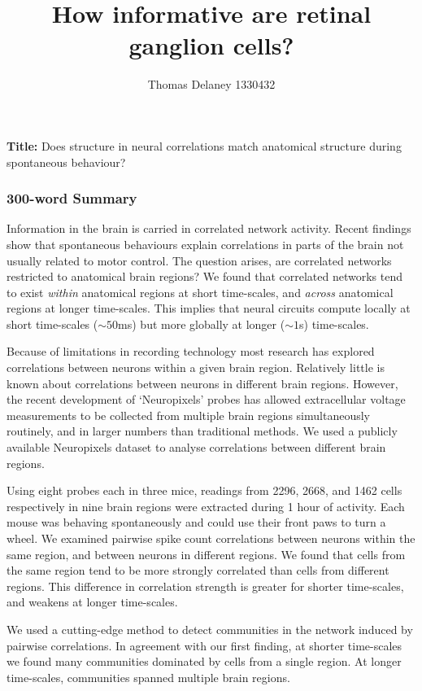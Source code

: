 \documentclass[a4paper,12pt]{article}
\title{How informative are retinal ganglion cells?}
\author{Thomas Delaney 1330432}
\theoremstyle{definition}
\begin{document}
\noindent
\textbf{Title:} Does structure in neural correlations match anatomical structure during spontaneous behaviour?
\vspace{-0.5cm}
\subsubsection*{300-word Summary}
\vspace{-0.3cm}
Information in the brain is carried in correlated network activity\cite{cohen1, cohen2}. Recent findings show that spontaneous behaviours explain correlations in parts of the brain not usually related to motor control\cite{stringer}. The question arises, are correlated networks restricted to anatomical brain regions? We found that correlated networks tend to exist \textit{within} anatomical regions at short time-scales, and \textit{across} anatomical regions at longer time-scales. This implies that neural circuits compute locally at short time-scales ($\sim 50$ms) but more globally at longer ($\sim 1$s) time-scales. 

Because of limitations in recording technology most research has explored correlations between neurons within a given brain region. Relatively little is known about correlations between neurons in different brain regions. However, the recent development of `Neuropixels' probes\cite{jun} has allowed extracellular voltage measurements to be collected from multiple brain regions simultaneously routinely, and in larger numbers than traditional methods. We used a publicly available Neuropixels dataset to analyse correlations between different brain regions.

Using eight probes each in three mice, readings from 2296, 2668, and 1462 cells respectively in nine brain regions were extracted during 1 hour of activity. Each mouse was behaving spontaneously and could use their front paws to turn a wheel\cite{stringer}. We examined pairwise spike count correlations between neurons within the same region, and between neurons in different regions. We found that cells from the same region tend to be more strongly correlated than cells from different regions. This difference in correlation strength is greater for shorter time-scales, and weakens at longer time-scales. 

We used a cutting-edge method\cite{humphries} to detect communities in the network induced by pairwise correlations. In agreement with our first finding, at shorter time-scales we found many communities dominated by cells from a single region. At longer time-scales, communities spanned multiple brain regions. 
\end{document}
